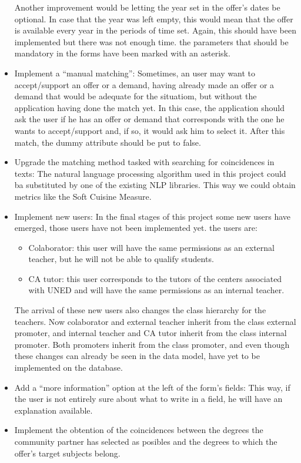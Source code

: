\documentclass[11pt]{book}
\begin{document}
\begin{itemize}
		Another improvement would be letting the year set in the offer's dates be optional. In case that the year was left empty, this would mean that the offer is available every year in the periods of time set. Again, this should have been implemented but there was not enough time. the parameters that should be mandatory in the forms have been marked with an asterisk.
		\item Implement a ``manual matching'': Sometimes, an user may want to accept/support an offer or a demand, having already made an offer or a demand that would be adequate for the situatiom, but without the application having done the match yet. In this case, the application should ask the user if he has an offer or demand that corresponds with the one he wants to accept/support and, if so, it would ask him to select it. After this match, the dummy attribute should be put to false.
		\item Upgrade the matching method tasked with searching for coincidences in texts: The natural language processing algorithm used in this project could ba substituted by one of the existing NLP libraries. This way we could obtain metrics like the Soft Cuisine Measure.
		\item Implement new users: In the final stages of this project some new users have emerged, those users have not been implemented yet. the users are:
		\begin{itemize}
			\item Colaborator: this user will have the same permissions as an external teacher, but he will not be able to qualify students.
			\item CA tutor: this user corresponds to the tutors of the centers associated with UNED and will have the same permissions as an internal teacher.
		\end{itemize}
		The arrival of these new users also changes the class hierarchy for the teachers. Now colaborator and external teacher inherit from the class external promoter, and internal teacher and CA tutor inherit from the class internal promoter. Both promoters inherit from the class promoter, and even though these changes can already be seen in the data model, have yet to be implemented on the database. 
		\item Add a ``more information'' option at the left of the form's fields: This way, if the user is not entirely sure about what to write in a field, he will have an explanation available.
		\item Implement the obtention of the coincidences between the degrees the community partner has selected as posibles and the degrees to which the offer's target subjects belong.
	\end{itemize}
	
\end{document}
